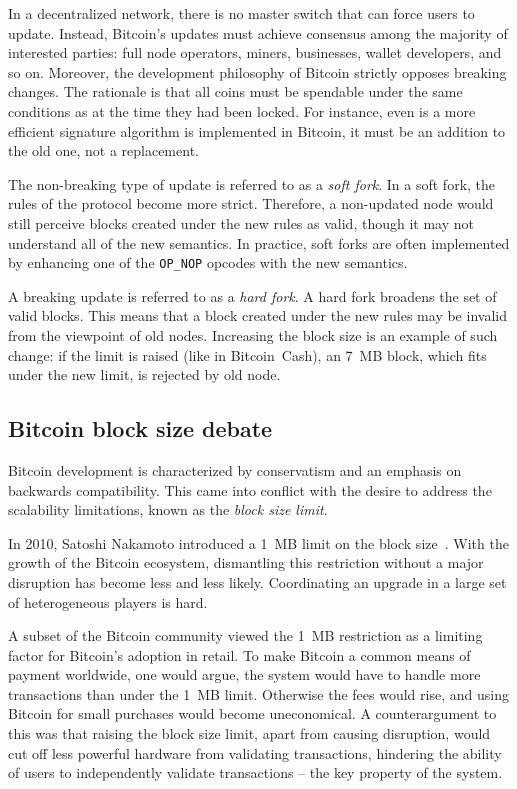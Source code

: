 In a decentralized network, there is no master switch that can force users to update.
Instead, Bitcoin's updates must achieve consensus among the majority of interested parties: full node operators, miners, businesses, wallet developers, and so on.
Moreover, the development philosophy of Bitcoin strictly opposes breaking changes.
The rationale is that all coins must be spendable under the same conditions as at the time they had been locked.
For instance, even is a more efficient signature algorithm is implemented in Bitcoin, it must be an addition to the old one, not a replacement.

The non-breaking type of update is referred to as a \textit{soft fork}.
In a soft fork, the rules of the protocol become more strict.
Therefore, a non-updated node would still perceive blocks created under the new rules as valid, though it may not understand all of the new semantics.
In practice, soft forks are often implemented by enhancing one of the \texttt{OP_NOP} opcodes with the new semantics.

A breaking update is referred to as a \textit{hard fork}.
A hard fork broadens the set of valid blocks.
This means that a block created under the new rules may be invalid from the viewpoint of old nodes.
Increasing the block size is an example of such change: if the limit is raised (like in Bitcoin~Cash), an 7~MB block, which fits under the new limit, is rejected by old node.

\subsection{Bitcoin block size debate}

Bitcoin development is characterized by conservatism and an emphasis on backwards compatibility.
This came into conflict with the desire to address the scalability limitations, known as the \textit{block size limit}.

In 2010, Satoshi Nakamoto introduced a 1~MB limit on the block size~\cite{Nakamoto2010}.
With the growth of the Bitcoin ecosystem, dismantling this restriction without a major disruption has become less and less likely.
Coordinating an upgrade in a large set of heterogeneous players is hard.

A subset of the Bitcoin community viewed the 1~MB restriction as a limiting factor for Bitcoin's adoption in retail.
To make Bitcoin a common means of payment worldwide, one would argue, the system would have to handle more transactions than under the 1~MB limit.
Otherwise the fees would rise, and using Bitcoin for small purchases would become uneconomical.
A counterargument to this was that raising the block size limit, apart from causing disruption, would cut off less powerful hardware from validating transactions, hindering the ability of users to independently validate transactions -- the key property of the system.

